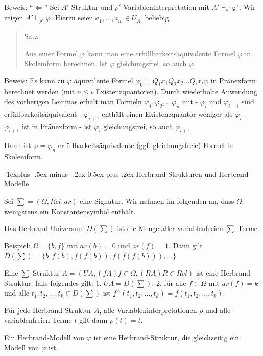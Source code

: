 \documentclass[a4paper]{article}
\makeatletter
\renewcommand{\subsection}{\@startsection{subsection}{2}{0mm}%
                {-1explus -.5ex minus -.2ex}%
                {0.5ex plus .2ex}%
                {\normalfont\normalsize\bfseries}}
\makeatother
\begin{document}
\begin{multicols}{3}
  Beweis: ``$\Leftarrow$'' Sei $A'$ Struktur und $\rho'$
  Variableninterpretation mit $A'\vdash_{\rho'}\varphi'$. Wir zeigen
  $A'\vdash_{\rho'}\varphi$. Hierzu seien $a_1,...,a_m\in U_{A'}$
  beliebig.

  \begin{quote}
    Satz

    Aus einer Formel $\varphi$ kann man eine erfüllbarkeitsäquivalente
    Formel $\varphi$ in Skolemform berechnen. Ist $\varphi$ gleichungsfrei,
    so auch $\varphi$.
  \end{quote}

  Beweis: Es kann zu $\varphi$ äquivalente Formel
  $\varphi_0 =Q_1 x_1 Q_2 x_2 ...Q_{\iota}  x_{\iota}   \psi$ in
  Pränexform berechnet werden (mit $n\leq {\iota}  $ Existenzquantoren).
  Durch wiederholte Anwendung des vorherigen Lemmas erhält man Formeln
  $\varphi_1,\varphi_2,...\varphi_n$ mit - $\varphi_i$ und $\varphi_{i+1}$
  sind erfüllbarkeitsäquivalent - $\varphi_{i+1}$ enthält einen
  Existenzquantor weniger als $\varphi_i$ - $\varphi_{i+1}$ ist in
  Pränexform - ist $\varphi_i$ gleichungsfrei, so auch $\varphi_{i+1}$

  Dann ist $\bar{\varphi}=\varphi_n$ erfüllbarkeitsäquivalente (ggf.
  gleichungsfreie) Formel in Skolemform.

  \subsection{Herbrand-Strukturen und
    Herbrand-Modelle}\label{herbrand-strukturen-und-herbrand-modelle}

  Sei $\sum= (\Omega,Rel,ar)$ eine Signatur. Wir nehmen im folgenden an,
  dass $\Omega$ wenigstens ein Konstantensymbol enthält.

  Das Herbrand-Universum $D(\sum)$ ist die Menge aller variablenfreien
  $\sum$-Terme.

  Beispiel: $\Omega =\{b,f\}$ mit $ar(b) =0$ und $ar(f) =1$. Dann gilt
  $D(\sum) =\{b,f(b),f(f(b)),f(f(f(b))),...\}$

  Eine $\sum$-Struktur $A=(UA,(fA)f\in\Omega,(RA)R\in Rel)$ ist eine
  Herbrand-Struktur, falls folgendes gilt: 1. $UA=D(\sum)$, 2. für alle
  $f\in\Omega$ mit $ar(f)=k$ und alle $t_1,t_2,...,t_k\in D(\sum)$ ist
  $f^A(t_1,t_2,...,t_k) =f(t_1,t_2,...,t_k)$.

  Für jede Herbrand-Struktur $A$, alle Variableninterpretationen $\rho$
  und alle variablenfreien Terme $t$ gilt dann $\rho(t) =t$.

  Ein Herbrand-Modell von $\varphi$ ist eine Herbrand-Struktur, die
  gleichzeitig ein Modell von $\varphi$ ist.


\end{multicols}
\end{document}
